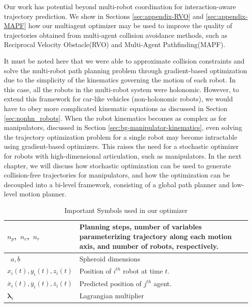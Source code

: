 Our work has potential beyond multi-robot coordination for interaction-aware trajectory prediction. We show in Sections \ref{sec:appendix-RVO} and \ref{sec:appendix-MAPF} how our multiagent optimizer may be used to improve the quality of trajectories obtained from multi-agent collision avoidance methods, such as Reciprocal Velocity Obstacle(RVO)\cite{RVO} and Multi-Agent Pathfinding(MAPF)\cite{sharon_journal}. 

It must be noted here that we were able to approximate collision constraints and solve the multi-robot path planning problem through gradient-based optimization due to the simplicity of the kinematics governing the motion of each robot. In this case, all the robots in the multi-robot system were holonomic. However, to extend this framework for car-like vehicles (non-holonomic robots), we would have to obey more complicated kinematic equations as discussed in Section \ref{sec:nonhn_robots}. When the robot kinematics becomes as complex as for manipulators, discussed in Section \ref{sec:bg-manipulator-kinematics}, even solving the trajectory optimization problem for a single robot may become intractable using gradient-based optimizers. This raises the need for a stochastic optimizer for robots with high-dimensional articulation, such as manipulators. In the next chapter, we will discuss how stochastic optimization can be used to generate collision-free trajectories for manipulators, and how the optimization can be decoupled into a bi-level framework, consisting of a global path planner and low-level motion planner.




\begin{table}
\centering
\caption{Important Symbols used in our optimizer} \label{table_1}
\scriptsize
\begin{tabular}{|p{3cm}|p{7cm}|p{7cm}|}\hline
\mbox{$n_{p}$, $n_{v}$, $n_{r}$}  & Planning steps, number of variables parameterizing trajectory along each motion axis, and number of robots, respectively.
\\ \hline
\mbox{ $a, b $} & Spheroid dimensions
\\ \hline
\mbox{$x_i(t), y_i(t), z_i(t)$} & 
 Position of $i^{th}$ robot at time $t$.
\\ \hline
\mbox{$\overline{x}_i(t), \overline{y}_i(t), \overline{z}_i(t)$} & Predicted position of $j^{th}$ agent.
\\ \hline
\mbox{$\boldsymbol{\lambda}_{i}$}
 &  Lagrangian multiplier 
\\ \hline
\end{tabular}
\normalsize
\vspace{-0.1cm}
\end{table}


